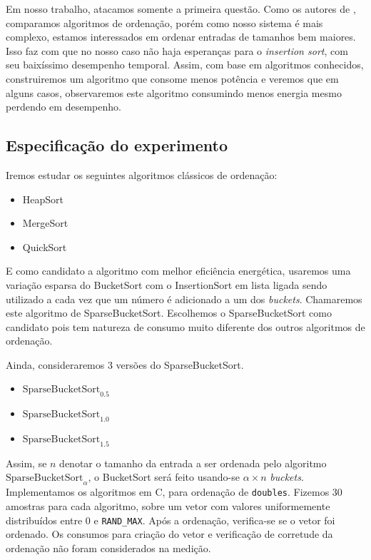 Em nosso trabalho, atacamos somente a primeira questão. Como os autores de \cite{bunse2009exploring}, comparamos algoritmos de ordenação, porém como nosso sistema é mais complexo, estamos interessados em ordenar entradas de tamanhos bem maiores. Isso faz com que no nosso caso não haja esperanças para o \emph{insertion sort}, com seu baixíssimo desempenho temporal. Assim, com base em algoritmos conhecidos, construiremos um algoritmo que consome menos potência e veremos que em alguns casos, observaremos este algoritmo consumindo menos energia mesmo perdendo em desempenho.

\subsection{Especificação do experimento}

Iremos estudar os seguintes algoritmos clássicos de ordenação:
\begin{itemize}
  \item HeapSort
  \item MergeSort
  \item QuickSort
\end{itemize}

E como candidato a algoritmo com melhor eficiência energética, usaremos uma variação esparsa do BucketSort com o InsertionSort em lista ligada sendo utilizado a cada vez que um número é adicionado a um dos \emph{buckets}. Chamaremos este algoritmo de SparseBucketSort. Escolhemos o SparseBucketSort como candidato pois tem natureza de consumo muito diferente dos outros algoritmos de ordenação.


Ainda, consideraremos 3 versões do SparseBucketSort.
\begin{itemize}
  \item $ \text{SparseBucketSort}_{0.5} $
  \item $ \text{SparseBucketSort}_{1.0} $
  \item $ \text{SparseBucketSort}_{1.5} $
\end{itemize}

Assim, se $ n $ denotar o tamanho da entrada a ser ordenada pelo algoritmo $ \text{SparseBucketSort}_{\alpha} $, o BucketSort será feito usando-se $ \alpha \times n $ \emph{buckets}.
\\

Implementamos os algoritmos em C, para ordenação de {\tt doubles}. Fizemos 30 amostras para cada algoritmo, sobre um vetor com valores uniformemente distribuídos entre 0 e {\tt RAND\_MAX}. Após a ordenação, verifica-se se o vetor foi ordenado. Os consumos para criação do vetor e verificação de corretude da ordenação não foram considerados na medição.

